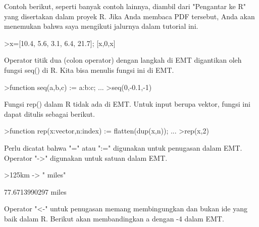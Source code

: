 \documentclass[a4paper,10pt]{article}
\begin{document}
\begin{eulernotebook}
\begin{eulercomment}
\begin{eulercomment}
\begin{eulercomment}
\begin{eulercomment}
\begin{eulercomment}
Contoh berikut, seperti banyak contoh lainnya, diambil dari "Pengantar
ke R" yang disertakan dalam proyek R. Jika Anda membaca PDF tersebut,
Anda akan menemukan bahwa saya mengikuti jalurnya dalam tutorial ini.
\end{eulercomment}
\begin{eulerprompt}
>x=[10.4, 5.6, 3.1, 6.4, 21.7]; [x,0,x]
\end{eulerprompt}
\begin{euleroutput}
  [10.4,  5.6,  3.1,  6.4,  21.7,  0,  10.4,  5.6,  3.1,  6.4,  21.7]
\end{euleroutput}
\begin{eulercomment}
Operator titik dua (colon operator) dengan langkah di EMT digantikan
oleh fungsi seq() di R. Kita bisa menulis fungsi ini di EMT.
\end{eulercomment}
\begin{eulerprompt}
>function seq(a,b,c) := a:b:c; ...
>seq(0,-0.1,-1)
\end{eulerprompt}
\begin{euleroutput}
  [0,  -0.1,  -0.2,  -0.3,  -0.4,  -0.5,  -0.6,  -0.7,  -0.8,  -0.9,  -1]
\end{euleroutput}
\begin{eulercomment}
Fungsi rep() dalam R tidak ada di EMT. Untuk input berupa vektor,
fungsi ini dapat ditulis sebagai berikut.
\end{eulercomment}
\begin{eulerprompt}
>function rep(x:vector,n:index) := flatten(dup(x,n)); ...
>rep(x,2)
\end{eulerprompt}
\begin{euleroutput}
  [10.4,  5.6,  3.1,  6.4,  21.7,  10.4,  5.6,  3.1,  6.4,  21.7]
\end{euleroutput}
\begin{eulercomment}
Perlu dicatat bahwa "=" atau ":=" digunakan untuk penugasan dalam EMT.
Operator "-\textgreater{}" digunakan untuk satuan dalam EMT.
\end{eulercomment}
\begin{eulerprompt}
>125km -> " miles"
\end{eulerprompt}
\begin{euleroutput}
  77.6713990297 miles
\end{euleroutput}
\begin{eulercomment}
Operator "\textless{}-" untuk penugasan memang membingungkan dan bukan ide yang
baik dalam R. Berikut akan membandingkan a dengan -4 dalam EMT.
\end{eulercomment}

\end{eulercomment}
\end{eulercomment}
\end{eulercomment}
\end{eulercomment}
\end{eulernotebook}
\end{document}
